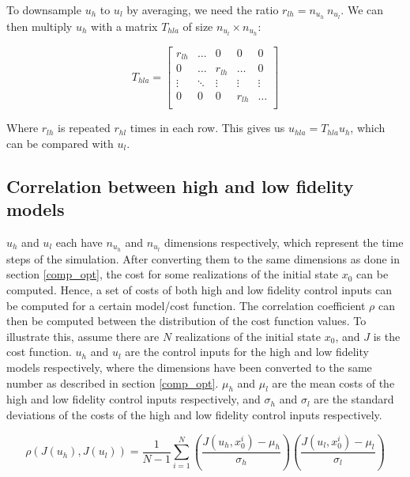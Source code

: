 \documentclass{article}
\begin{document}
To downsample $u_h$ to $u_l$ by averaging, we need the ratio $r_{lh} = n_{u_h} \ n_{u_l}$.
We can then multiply $u_h$ with a matrix $T_{hla}$ of size $n_{u_l} \times n_{u_h}$:

\begin{equation}
  T_{hla} =
  \begin{bmatrix}
    r_{lh} & \ldots & 0 & 0 & 0 \\
    0 & \ldots & r_{lh} & \ldots & 0 \\
    \vdots & \ddots & \vdots & \vdots & \vdots \\
    0 & 0 & 0 & r_{lh} & \ldots \\
  \end{bmatrix}
\end{equation}

Where $r_{lh}$ is repeated $r_{hl}$ times in each row.
This gives us $u_{hla} = T_{hla} u_h$, which can be compared with $u_l$.

\subsection{Correlation between high and low fidelity models}

$u_h$ and $u_l$ each have $n_{u_h}$ and $n_{u_l}$ dimensions respectively, which represent the time steps of the simulation.
After converting them to the same dimensions as done in section \ref{comp_opt},
the cost for some realizations of the initial state $x_0$ can be computed.
Hence, a set of costs of both high and low fidelity control inputs can be computed for a certain model/cost function.
The correlation coefficient $\rho$ can then be computed between the distribution of the cost function values.
To illustrate this, assume there are $N$ realizations of the initial state $x_0$, and $J$ is the cost function.
$u_h$ and $u_l$ are the control inputs for the high and low fidelity models respectively, where the dimensions have been
converted to the same number as described in section \ref{comp_opt}. $\mu_h$ and $\mu_l$ are the mean costs
of the high and low fidelity control inputs respectively, and $\sigma_h$ and $\sigma_l$ are the standard deviations of
the costs of the high and low fidelity control inputs respectively.

\begin{equation}
  \rho(J(u_h), J(u_l)) = \frac{1}{N-1} \sum_{i=1}^{N} \left( \frac{J(u_h, x_0^i) - \mu_h}{\sigma_h} \right) \left( \frac{J(u_l, x_0^i) - \mu_l}{\sigma_l} \right)
\end{equation}
\end{document}
